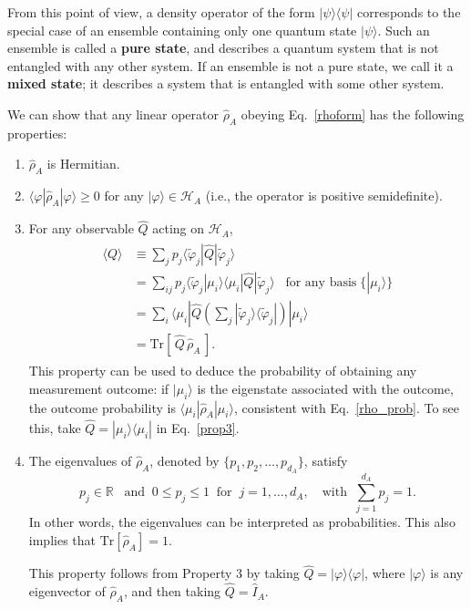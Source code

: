 \documentclass[pra,12pt]{revtex4}
\begin{document}
From this point of view, a density operator of the form
$|\psi\rangle\langle\psi|$ corresponds to the special case of an
ensemble containing only one quantum state $|\psi\rangle$.  Such an
ensemble is called a \textbf{pure state}, and describes a quantum
system that is not entangled with any other system.  If an ensemble is
not a pure state, we call it a \textbf{mixed state}; it describes a
system that is entangled with some other system.

We can show that any linear operator $\hat{\rho}_A$ obeying
Eq.~\eqref{rhoform} has the following properties:
\begin{enumerate}
\item $\hat{\rho}_A$ is Hermitian.

\item $\langle\varphi|\hat{\rho}_A|\varphi\rangle \ge 0$ for any
  $|\varphi\rangle \in \mathscr{H}_A$ (i.e., the operator is positive
  semidefinite).

\item For any observable $\hat{Q}$ acting on $\mathscr{H}_A$,
  \begin{align}
    \begin{aligned}
      \langle Q \rangle &\equiv \sum_j p_j
      \langle \tilde{\varphi}_j|\hat{Q}|\tilde{\varphi}_j\rangle \\
      &= \sum_{ij} p_j
      \langle \tilde{\varphi}_j|\mu_i\rangle\langle\mu_i|\hat{Q}|\tilde{\varphi}_j\rangle \;\;\;\textrm{for any basis} \;\{|\mu_i\rangle\} \\
      &= \sum_i
      \langle\mu_i|\hat{Q} \left(\sum_j |\tilde{\varphi}_j\rangle
      \langle \tilde{\varphi}_j|\right) |\mu_i\rangle \\
      &= \mathrm{Tr}\left[\,\hat{Q} \,\hat{\rho}_A\,\right].
    \end{aligned}
    \label{prop3}
  \end{align}
  This property can be used to deduce the probability of obtaining any
  measurement outcome: if $|\mu_i\rangle$ is the eigenstate associated
  with the outcome, the outcome probability is
  $\langle\mu_i|\hat\rho_A|\mu_i\rangle$, consistent with
  Eq.~\eqref{rho_prob}.  To see this, take $\hat{Q} = |\mu_i\rangle
  \langle \mu_i|$ in Eq.~\eqref{prop3}.
  
\item The eigenvalues of $\hat{\rho}_A$, denoted by $\{p_1, p_2,
  \dots, p_{d_A}\}$, satisfy
  \begin{equation}
    p_j \in \mathbb{R} \;\;\;\mathrm{and}\;\; 0 \le p_j \le 1 \;\;
    \mathrm{for}\;\; j = 1,\dots,d_A,
    \quad\mathrm{with}\;\; \sum_{j=1}^{d_A} p_j = 1.
    \label{trrho_reduced}    
  \end{equation}
  In other words, the eigenvalues can be interpreted as probabilities.
  This also implies that $\mathrm{Tr}[\hat\rho_A] = 1$.

  This property follows from Property 3 by taking $\hat{Q} =
  |\varphi\rangle\langle\varphi|$, where $|\varphi\rangle$ is any
  eigenvector of $\hat\rho_A$, and then taking $\hat{Q} = \hat{I}_A$.
\end{enumerate}
\end{document}
